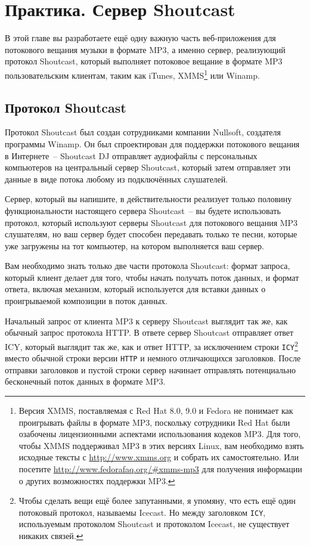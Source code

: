 \chapter{Практика. Сервер Shoutcast}
\label{ch:28}

В этой главе вы разработаете ещё одну важную часть веб-приложения для потокового вещания
музыки в формате MP3, а именно сервер, реализующий протокол Shoutcast, который
выполняет потоковое вещание в формате MP3 пользовательским клиентам, таким как iTunes,
XMMS\footnote{Версия XMMS, поставляемая с Red Hat 8.0, 9.0 и Fedora не понимает как
  проигрывать файлы в формате MP3, поскольку сотрудники Red Hat были озабочены
  лицензионными аспектами использования кодеков MP3.  Для того, чтобы XMMS поддерживал MP3
  в этих версиях Linux, вам необходимо взять исходные тексты с \url{http://www.xmms.org} и
  собрать их самостоятельно.  Или посетите \url{http://www.fedorafaq.org/#xmms-mp3} для
  получения информации о других возможностях поддержки MP3.} или Winamp.

\section{Протокол Shoutcast}

Протокол Shoutcast был создан сотрудниками компании Nullsoft, создателя программы
Winamp. Он был спроектирован для поддержки потокового вещания в Интернете~-- Shoutcast DJ
отправляет аудиофайлы с персональных компьютеров на центральный сервер Shoutcast, который
затем отправляет эти данные в виде потока любому из подключённых слушателей.

Сервер, который вы напишите, в действительности реализует только половину функциональности
настоящего сервера Shoutcast~-- вы будете использовать протокол, который используют
серверы Shoutcast для потокового вещания MP3 слушателям, но ваш сервер будет способен
передавать только те песни, которые уже загружены на тот компьютер, на котором выполняется
ваш сервер.

Вам необходимо знать только две части протокола Shoutcast: формат запроса, который клиент
делает для того, чтобы начать получать поток данных, и формат ответа, включая механизм,
который используется для вставки данных о проигрываемой композиции в поток данных.

Начальный запрос от клиента MP3 к серверу Shoutcast выглядит так же, как обычный запрос
протокола HTTP.  В ответе сервер Shoutcast отправляет ответ ICY, который выглядит так же,
как и ответ HTTP, за исключением строки \lstinline{ICY}\footnote{Чтобы сделать вещи ещё более
  запутанными, я упомяну, что есть ещё один потоковый протокол, называемы Icecast. Но
  между заголовком \lstinline{ICY}, используемым протоколом Shoutcast и протоколом Icecast, не
  существует никаких связей.} вместо обычной строки версии \lstinline{HTTP} и немного
отличающихся заголовков. После отправки заголовков и пустой строки сервер начинает
отправлять потенциально бесконечный поток данных в формате MP3.


